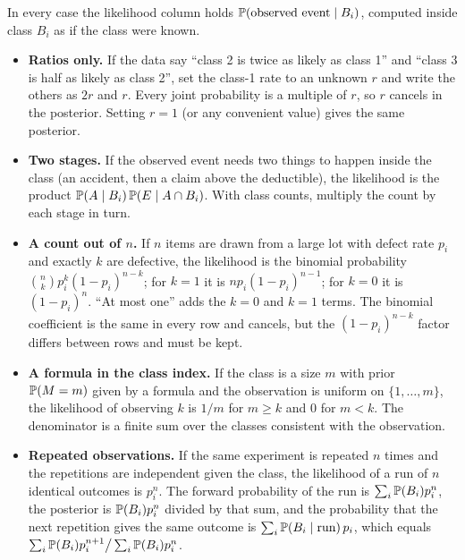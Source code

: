 \begin{keyfact}
In every case the likelihood column holds $\mathbb{P}(\text{observed event} \mid B_i)$, computed
inside class $B_i$ as if the class were known.
\begin{itemize}[nosep,leftmargin=2em]
  \item \textbf{Ratios only.} If the data say ``class 2 is twice as likely as class 1'' and
        ``class 3 is half as likely as class 2'', set the class-1 rate to an unknown $r$ and
        write the others as $2r$ and $r$. Every joint probability is a multiple of $r$, so $r$
        cancels in the posterior. Setting $r = 1$ (or any convenient value) gives the same
        posterior.
  \item \textbf{Two stages.} If the observed event needs two things to happen inside the class
        (an accident, then a claim above the deductible), the likelihood is the product
        $\mathbb{P}(A \mid B_i)\,\mathbb{P}(E \mid A \cap B_i)$. With class counts, multiply the count by
        each stage in turn.
  \item \textbf{A count out of $n$.} If $n$ items are drawn from a large lot with defect rate
        $p_i$ and exactly $k$ are defective, the likelihood is the binomial probability
        $\binom{n}{k} p_i^k (1 - p_i)^{n-k}$; for $k = 1$ it is $n p_i (1 - p_i)^{n-1}$; for
        $k = 0$ it is $(1 - p_i)^n$. ``At most one'' adds the $k = 0$ and $k = 1$ terms. The
        binomial coefficient is the same in every row and cancels, but the $(1 - p_i)^{n-k}$
        factor differs between rows and must be kept.
  \item \textbf{A formula in the class index.} If the class is a size $m$ with prior $\mathbb{P}(M = m)$
        given by a formula and the observation is uniform on $\{1, \dots, m\}$, the likelihood
        of observing $k$ is $1/m$ for $m \geq k$ and $0$ for $m < k$. The denominator is a
        finite sum over the classes consistent with the observation.
  \item \textbf{Repeated observations.} If the same experiment is repeated $n$ times and the
        repetitions are independent given the class, the likelihood of a run of $n$ identical
        outcomes is $p_i^n$. The forward probability of the run is $\sum_i \mathbb{P}(B_i) p_i^n$,
        the posterior is $\mathbb{P}(B_i) p_i^n$ divided by that sum, and the probability that the
        next repetition gives the same outcome is $\sum_i \mathbb{P}(B_i \mid \text{run})\,p_i$,
        which equals $\sum_i \mathbb{P}(B_i) p_i^{n+1} \big/ \sum_i \mathbb{P}(B_i) p_i^n$.
\end{itemize}
\end{keyfact}

